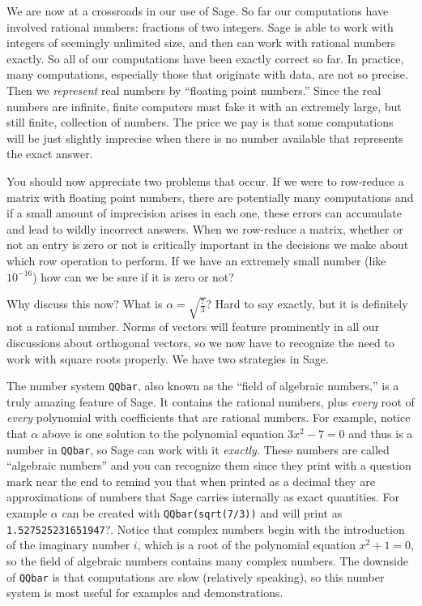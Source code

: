 We are now at a crossroads in our use of Sage.  So far our computations have involved rational numbers: fractions of two integers.  Sage is able to work with integers of seemingly unlimited size, and then can work with rational numbers exactly.  So all of our computations have been exactly correct so far.  In practice, many computations, especially those that originate with data, are not so precise.  Then we \emph{represent} real numbers by ``floating point numbers.''  Since the real numbers are infinite, finite computers must fake it with an extremely large, but still finite, collection of numbers.  The price we pay is that some computations will be just slightly imprecise when there is no number available that represents the exact answer.\par
%
You should now appreciate two problems that occur.  If we were to row-reduce a matrix with floating point numbers, there are potentially many computations and if a small amount of imprecision arises in each one, these errors can accumulate and lead to wildly incorrect answers.  When we row-reduce a matrix, whether or not an entry is zero or not is critically important in the decisions we make about which row operation to perform.  If we have an extremely small number (like $10^{-16}$) how can we be sure if it is zero or not?\par
%
Why discuss this now?  What is $\alpha=\sqrt{\frac{7}{3}}$?  Hard to say exactly, but it is definitely not a rational number.  Norms of vectors will feature prominently in all our discussions about orthogonal vectors, so we now have to recognize the need to work with square roots properly.  We have two strategies in Sage.\par
%
The number system \verb?QQbar?, also known as the ``field of algebraic numbers,'' is a truly amazing feature of Sage.  It contains the rational numbers, plus \emph{every} root of \emph{every} polynomial with coefficients that are rational numbers.  For example, notice that $\alpha$ above is one solution to the polynomial equation $3x^2-7=0$ and thus is a number in \verb?QQbar?, so Sage can work with it \emph{exactly}.  These numbers are called ``algebraic numbers'' and you can recognize them since they print with a question mark near the end to remind you that when printed as a decimal they are approximations of numbers that Sage carries internally as exact quantities.  For example $\alpha$ can be created with \verb?QQbar(sqrt(7/3))? and will print as \verb?1.527525231651947??.  Notice that complex numbers begin with the introduction of the imaginary number $i$, which is a root of the polynomial equation $x^2+1=0$, so the field of algebraic numbers contains many complex numbers.  The downside of \verb?QQbar? is that computations are slow (relatively speaking), so this number system is most useful for examples and demonstrations.\par

